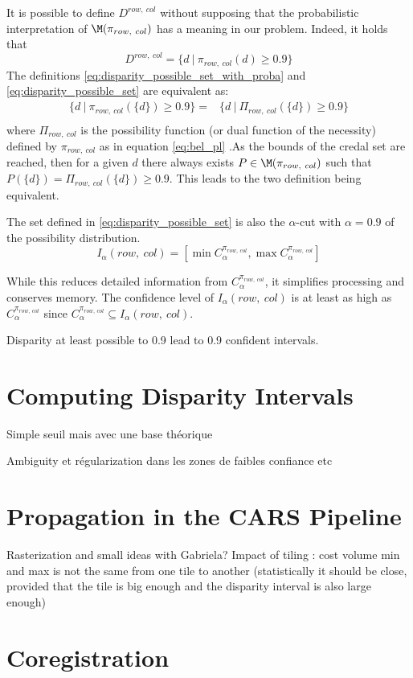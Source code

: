 It is possible to define \( D^{row,~col} \) without supposing that the probabilistic interpretation of \( \M(\pi_{row,~col}) \) has a meaning in our problem. Indeed, it holds that 
\begin{equation}
    D^{row,~col}=\{ d~|~\pi_{row,~col}(d)\geqslant 0.9 \}\label{eq:disparity_possible_set}
\end{equation}
The definitions \eqref{eq:disparity_possible_set_with_proba} and \eqref{eq:disparity_possible_set} are equivalent as:
\begin{align*}
    \{ d~|~\pi_{row,~col}(\{d\})\geqslant 0.9 \} =& \{ d~|~\Pi_{row,~col}(\{d\})\geqslant 0.9 \}\\
\end{align*}
where \( \Pi_{row,~col} \) is the possibility function (or dual function of the necessity) defined by \( \pi_{row,~col} \) as in equation \eqref{eq:bel_pl} .As the bounds of the credal set are reached, then for a given \(d\) there always exists \(P\in\M(\pi_{row,~col})\) such that \( P(\{d\}) = \Pi_{row,~col}(\{d\})\geqslant 0.9\). This leads to the two definition being equivalent.

The set defined in \eqref{eq:disparity_possible_set} is also the \(\alpha\)-cut with \(\alpha=0.9\) of the possibility distribution. 
\begin{equation}
    I_\alpha(row,~col) = [\min C^{\pi_{row,~col}}_\alpha, \max C^{\pi_{row,~col}}_\alpha] \label{eq:confidence_interval}
\end{equation}

While this reduces detailed information from \( C^{\pi_{row,~col}}_\alpha \), it simplifies processing and conserves memory. The confidence level of \( I_\alpha(row,~col) \) is at least as high as \( C^{\pi_{row,~col}}_\alpha \) since \( C^{\pi_{row,~col}}_\alpha \subseteq I_\alpha(row,~col) \). 

Disparity at least possible to 0.9 lead to 0.9 confident intervals. 

\section{Computing Disparity Intervals}
Simple seuil mais avec une base théorique

Ambiguity et régularization dans les zones de faibles confiance etc
\section{Propagation in the CARS Pipeline}
Rasterization and small ideas with Gabriela?
Impact of tiling : cost volume min and max is not the same from one tile to another (statistically it should be close, provided that the tile is big enough and the disparity interval is also large enough)
\section{Coregistration}
\pagebreak